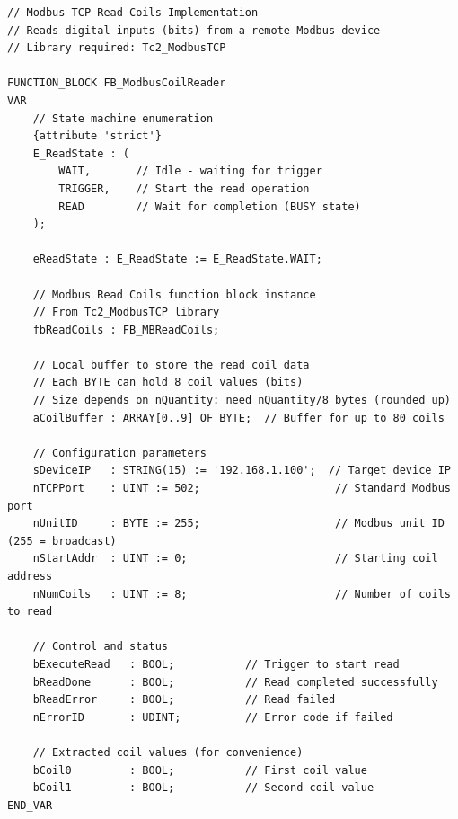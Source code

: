 \documentclass[11pt,a4paper]{article}
\begin{document}
\begin{lstlisting}
// Modbus TCP Read Coils Implementation
// Reads digital inputs (bits) from a remote Modbus device
// Library required: Tc2_ModbusTCP

FUNCTION_BLOCK FB_ModbusCoilReader
VAR
    // State machine enumeration
    {attribute 'strict'}
    E_ReadState : (
        WAIT,       // Idle - waiting for trigger
        TRIGGER,    // Start the read operation
        READ        // Wait for completion (BUSY state)
    );
    
    eReadState : E_ReadState := E_ReadState.WAIT;
    
    // Modbus Read Coils function block instance
    // From Tc2_ModbusTCP library
    fbReadCoils : FB_MBReadCoils;
    
    // Local buffer to store the read coil data
    // Each BYTE can hold 8 coil values (bits)
    // Size depends on nQuantity: need nQuantity/8 bytes (rounded up)
    aCoilBuffer : ARRAY[0..9] OF BYTE;  // Buffer for up to 80 coils
    
    // Configuration parameters
    sDeviceIP   : STRING(15) := '192.168.1.100';  // Target device IP
    nTCPPort    : UINT := 502;                     // Standard Modbus port
    nUnitID     : BYTE := 255;                     // Modbus unit ID (255 = broadcast)
    nStartAddr  : UINT := 0;                       // Starting coil address
    nNumCoils   : UINT := 8;                       // Number of coils to read
    
    // Control and status
    bExecuteRead   : BOOL;           // Trigger to start read
    bReadDone      : BOOL;           // Read completed successfully
    bReadError     : BOOL;           // Read failed
    nErrorID       : UDINT;          // Error code if failed
    
    // Extracted coil values (for convenience)
    bCoil0         : BOOL;           // First coil value
    bCoil1         : BOOL;           // Second coil value
END_VAR
\end{lstlisting}
\end{document}
